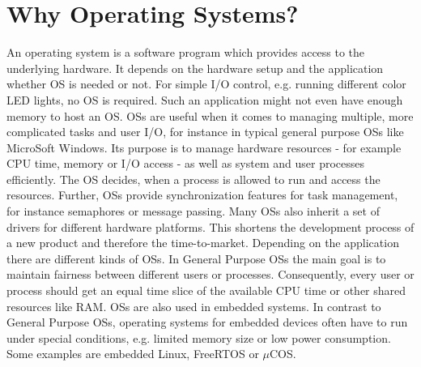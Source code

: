 \section{Why Operating Systems?}
An operating system is a software program which provides access to the underlying hardware. 
It depends on the hardware setup and the application whether \ac{OS} is needed or not.
For simple \ac{I/O} control, e.g. running different color LED lights, no \ac{OS} is required.
Such an application might not even have enough memory to host an \ac{OS}.
\acp{OS} are useful when it comes to managing multiple, more complicated tasks and user \ac{I/O}, for instance in typical general purpose \acp{OS} like MicroSoft Windows.
Its purpose is to manage hardware resources - for example \ac{CPU} time, memory or \ac{I/O} access - as well as system and user processes efficiently. 
The \ac{OS} decides, when a process is allowed to run and access the resources.
Further, \acp{OS} provide synchronization features for task management, for instance semaphores or message passing.
Many \acp{OS} also inherit a set of drivers for different hardware platforms.
This shortens the development process of a new product and therefore the time-to-market.
Depending on the application there are different kinds of \acp{OS}. 
In General Purpose \acp{OS} the main goal is to maintain fairness between different users or processes. 
Consequently, every user or process should get an equal time slice of the available \ac{CPU} time or other shared resources like \ac{RAM}. 
\acp{OS} are also used in embedded systems. 
In contrast to General Purpose \acp{OS}, operating systems for embedded devices often have to run under special conditions, e.g. limited memory size or low power consumption. 
Some examples are embedded Linux, FreeRTOS or $\mu$COS.

